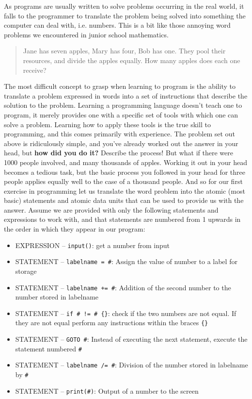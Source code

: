 As programs are usually written to solve problems occurring in the   real world, it falls to the programmer to translate the problem being   solved into something the computer can deal with, i.e. numbers. This is   a bit like those annoying word problems we encountered in junior   school mathematics.
\begin{quotation}     Jane has seven apples, Mary has four, Bob has one. They pool their    resources, and divide the apples equally. How many apples does each    one receive?    
\end{quotation}

The most difficult concept to grasp when learning to program is the   ability to translate a problem expressed in words into a set of   instructions that describe the solution to the problem. Learning a   programming language doesn't teach one to program, it merely provides   one with a specific set of tools with which one can solve a problem.   Learning how to apply these tools is the true skill to programming, and   this comes primarily with experience. The problem set out above is   ridiculously simple, and you've already worked out the answer in your   head, but \textbf{how did you do it?} Describe the process! But   what if there were 1000 people involved, and many thousands of apples.   Working it out in your head becomes a tedious task, but the basic   process you followed in your head for three people applies equally well   to the case of a thousand people. And so for our first exercise in   programming let us translate the word problem into the atomic (most basic)   statements and atomic data units that can be used to provide us with   the answer. Assume we are provided with only the following statements   and expressions to work with, and that statements are numbered from 1   upwards in the order in which they appear in our program:
\begin{itemize}
	\item EXPRESSION -- \texttt{input()}: get a number from input
	\item STATEMENT -- \texttt{labelname = \#}: Assign the value of number to    a label for storage
	\item STATEMENT -- \texttt{labelname += \#}: Addition of the second number    to the number stored in labelname
	\item STATEMENT -- \texttt{if \# != \# \{\}}: check if the two numbers    are not equal. If they are not equal perform any instructions    within the braces \texttt{\{\}}
	\item STATEMENT -- \texttt{GOTO \#}: Instead of executing the next    statement, execute the statement numbered \texttt{\#}
	\item STATEMENT -- \texttt{labelname /= \#}: Division of the number stored    in labelname by \texttt{\#}
	\item STATEMENT -- \texttt{print(\#)}: Output of a number to the    screen
\end{itemize}


